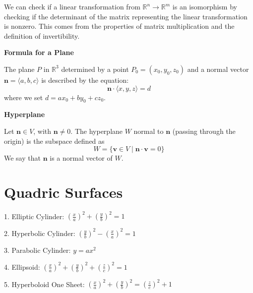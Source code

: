 \documentclass{article}
\newcommand{\R}{\mathbb{R}}
\begin{document}
We can check if a linear transformation from \( \R^n \to \R^m \) is an isomorphism by checking if the determinant of the matrix representing the linear transformation is nonzero. This comes from the properties of matrix multiplication and the definition of invertibility. 

\vspace{0.5cm}

\noindent \textbf{Formula for a Plane}

The plane \( P \) in \( \mathbb{R}^3 \) determined by a point \( P_0 = (x_0, y_0, z_0) \) and a normal vector \( \bm{n} = \langle a, b, c \rangle \) is described by the equation:
\[ \bm{n} \cdot \langle x, y, z \rangle = d \]
where we set \( d = ax_0 + by_0 + cz_0 \).

\vspace{0.5cm}

\noindent \textbf{Hyperplane}

Let \( \bm{n} \in V \), with \( \bm{n} \neq 0 \). The hyperplane \( W \) normal to \( \bm{n} \) (passing through the origin) is the subspace defined as
\[ W = \{\bm{v} \in V \mid \bm{n} \cdot \bm{v} = 0\} \]
We say that \( \bm{n} \) is a normal vector of \( W \).

\section*{Quadric Surfaces}


1. Elliptic Cylinder: \( \left( \frac{x}{a} \right)^2  + \left( \frac{y}{b} \right)^2 = 1 \) 



2. Hyperbolic Cylinder: \( \left( \frac{y}{b} \right)^2  - \left( \frac{x}{a} \right)^2 = 1 \) 




3. Parabolic Cylinder: \( y = ax^2 \)



4. Ellipsoid: \( \left( \frac{x}{a} \right)^2  + \left( \frac{y}{b} \right)^2 + \left( \frac{z}{c} \right)^2 = 1 \)



5. Hyperboloid One Sheet: \(
\left( \frac{x}{a} \right)^2 + \left( \frac{y}{b} \right)^2 = \left( \frac{z}{c} \right)^2 + 1
\)
\end{document}
